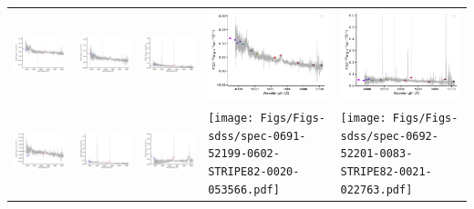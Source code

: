\begin{center}
\begin{longtable}{l l l l l }
    \includegraphics[width=0.19\linewidth, clip]{Figs/Figs-sdss/spec-0514-51994-0016-SPLUS-n02n21-042463.pdf} & \includegraphics[width=0.19\linewidth, clip]{Figs/Figs-sdss/spec-0687-52518-0113-STRIPE82-0008-003185.pdf} & \includegraphics[width=0.19\linewidth, clip]{Figs/Figs-sdss/spec-0687-52518-0444-STRIPE82-0008-056238.pdf} & \includegraphics[width=0.19\linewidth, clip]{Figs/Figs-sdss/spec-0687-52518-0474-STRIPE82-0008-013742.pdf} & \includegraphics[width=0.19\linewidth, clip]{Figs/Figs-sdss/spec-0688-52203-0315-STRIPE82-0007-044146.pdf} \\
    \includegraphics[width=0.19\linewidth, clip]{Figs/Figs-sdss/spec-0689-52262-0087-STRIPE82-0013-019963.pdf} & \includegraphics[width=0.19\linewidth, clip]{Figs/Figs-sdss/spec-0689-52262-0247-STRIPE82-0011-015494.pdf} & \includegraphics[width=0.19\linewidth, clip]{Figs/Figs-sdss/spec-0689-52262-0468-STRIPE82-0012-027933.pdf} & \texttt{[image: Figs/Figs-sdss/spec-0691-52199-0602-STRIPE82-0020-053566.pdf]} & \texttt{[image: Figs/Figs-sdss/spec-0692-52201-0083-STRIPE82-0021-022763.pdf]} \\

\end{longtable}
\end{center}
